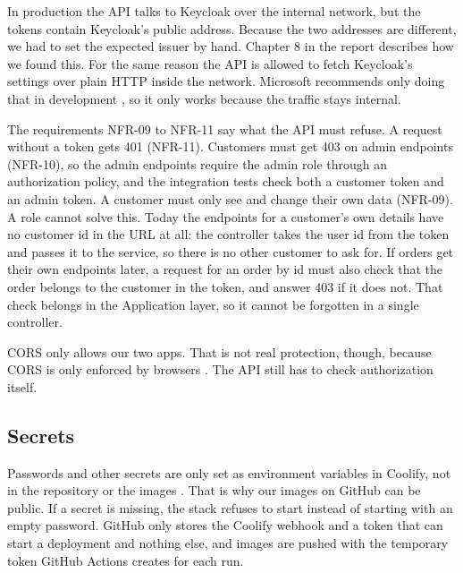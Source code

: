 \documentclass[a4paper,11pt]{article}
\begin{document}
In production the API talks to Keycloak over the internal network, but the tokens contain Keycloak's public address. Because the two addresses are different, we had to set the expected issuer by hand. Chapter 8 in the report describes how we found this. For the same reason the API is allowed to fetch Keycloak's settings over plain HTTP inside the network. Microsoft recommends only doing that in development \cite{microsoft-jwtbearer-requirehttpsmetadata}, so it only works because the traffic stays internal.

The requirements NFR-09 to NFR-11 say what the API must refuse. A request without a token gets 401 (NFR-11). Customers must get 403 on admin endpoints (NFR-10), so the admin endpoints require the admin role through an authorization policy, and the integration tests check both a customer token and an admin token. A customer must only see and change their own data (NFR-09). A role cannot solve this. Today the endpoints for a customer's own details have no customer id in the URL at all: the controller takes the user id from the token and passes it to the service, so there is no other customer to ask for. If orders get their own endpoints later, a request for an order by id must also check that the order belongs to the customer in the token, and answer 403 if it does not. That check belongs in the Application layer, so it cannot be forgotten in a single controller.

CORS only allows our two apps. That is not real protection, though, because CORS is only enforced by browsers \cite[sec.~3.1.1]{desanctis-web-apis-aspnet-core}. The API still has to check authorization itself.

\subsection{Secrets}
Passwords and other secrets are only set as environment variables in Coolify, not in the repository or the images \cite[sec.~12.1.4]{desanctis-web-apis-aspnet-core}\cite{microsoft-aspnetcore-app-secrets}. That is why our images on GitHub can be public. If a secret is missing, the stack refuses to start instead of starting with an empty password. GitHub only stores the Coolify webhook and a token that can start a deployment and nothing else, and images are pushed with the temporary token GitHub Actions creates for each run.
\end{document}
